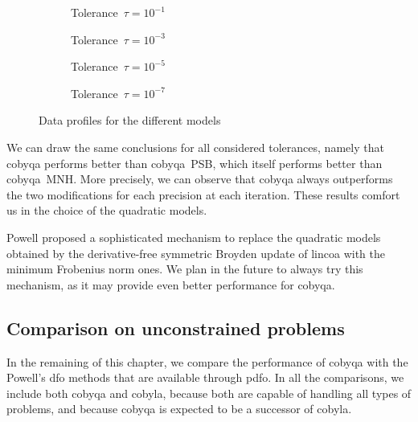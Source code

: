\begin{figure}[ht]
    \centering
    \begin{subfigure}[b]{0.49\textwidth}
        \centering
        \caption{Tolerance~$\tau = 10^{-1}$}
    \end{subfigure}
    \hfill
    \begin{subfigure}[b]{0.49\textwidth}
        \centering
        \caption{Tolerance~$\tau = 10^{-3}$}
    \end{subfigure}
    \begin{subfigure}[b]{0.49\textwidth}
        \centering
        \caption{Tolerance~$\tau = 10^{-5}$}
    \end{subfigure}
    \hfill
    \begin{subfigure}[b]{0.49\textwidth}
        \centering
        \caption{Tolerance~$\tau = 10^{-7}$}
    \end{subfigure}
    \caption{Data profiles for the different models}
    \label{fig:data-models}
\end{figure}

We can draw the same conclusions for all considered tolerances, namely that \gls{cobyqa} performs better than \gls{cobyqa}~PSB, which itself performs better than \gls{cobyqa}~MNH.
More precisely, we can observe that \gls{cobyqa} always outperforms the two modifications for each precision at each iteration.
These results comfort us in the choice of the quadratic models.

Powell proposed a sophisticated mechanism to replace the quadratic models obtained by the derivative-free symmetric Broyden update of \gls{lincoa} with the minimum Frobenius norm ones.
We plan in the future to always try this mechanism, as it may provide even better performance for \gls{cobyqa}.

\subsection{Comparison on unconstrained problems}

In the remaining of this chapter, we compare the performance of \gls{cobyqa} with the Powell's \gls{dfo} methods that are available through \gls{pdfo}.
In all the comparisons, we include both \gls{cobyqa} and \gls{cobyla}, because both are capable of handling all types of problems, and because \gls{cobyqa} is expected to be a successor of \gls{cobyla}.

